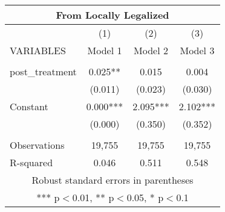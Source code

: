 \begin{tabular}{lccc}
\multicolumn{4}{c}{From Locally Legalized} \\ \hline
 & (1) & (2) & (3) \\
VARIABLES & Model 1 & Model 2 & Model 3 \\ \hline
 &  &  &  \\
post\_treatment & 0.025** & 0.015 & 0.004 \\
 & (0.011) & (0.023) & (0.030) \\
Constant & 0.000*** & 2.095*** & 2.102*** \\
 & (0.000) & (0.350) & (0.352) \\
 &  &  &  \\
Observations & 19,755 & 19,755 & 19,755 \\
 R-squared & 0.046 & 0.511 & 0.548 \\ \hline
\multicolumn{4}{c}{ Robust standard errors in parentheses} \\
\multicolumn{4}{c}{ *** p$<$0.01, ** p$<$0.05, * p$<$0.1} \\
\end{tabular}
